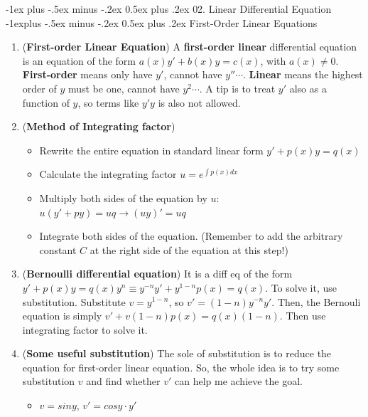 \documentclass[10pt, landscape]{article}
\makeatletter
\renewcommand{\section}{\@startsection{section}{1}{0mm}%
                                {-1ex plus -.5ex minus -.2ex}%
                                {0.5ex plus .2ex}%
                                {\normalfont\large\bfseries}}
\renewcommand{\subsection}{\@startsection{subsection}{2}{0mm}%
                                {-1explus -.5ex minus -.2ex}%
                                {0.5ex plus .2ex}%
                                {\normalfont\normalsize\bfseries}}
\makeatother
\begin{document}
\begin{multicols}{4}
\section{02. Linear Differential Equation}
\subsection{First-Order Linear Equations}
\begin{enumerate}
    \item (\textbf{First-order Linear Equation}) A \textbf{first-order linear} differential equation is an equation of the form $a(x)y'+b(x)y=c(x)$, with $a(x)\neq 0$. \textbf{First-order} means only have $y'$, cannot have $y'' \cdots$. \textbf{Linear} means the highest order of $y$ must be one, cannot have $y^2 \cdots$. A tip is to treat $y'$ also as a function of $y$, so terms like $y'y$ is also not allowed.
    \item (\textbf{Method of Integrating factor})
    \begin{itemize}
        \item Rewrite the entire equation in standard linear form $y'+p(x)y=q(x)$
        \item Calculate the integrating factor $u=e^{\int p(x)dx}$
        \item Multiply both sides of the equation by $u$: $u(y'+py)=uq\rightarrow (uy)'=uq$
        \item Integrate both sides of the equation. (Remember to add the arbitrary constant $C$ at the right side of the equation at this step!)
    \end{itemize}
    \item (\textbf{Bernoulli differential equation}) It is a diff eq of the form $y'+p(x)y=q(x)y^n\equiv y^{-n}y'+y^{1-n}p(x)=q(x)$. To solve it, use substitution. Substitute $v=y^{1-n}$, so $v'=(1-n)y^{-n}y'$. Then, the Bernouli equation is simply $v'+v(1-n)p(x)=q(x)(1-n)$. Then use integrating factor to solve it.
    \item (\textbf{Some useful substitution}) The sole of substitution is to reduce the equation for first-order linear equation. So, the whole idea is to try some substitution $v$ and find whether $v'$ can help me achieve the goal.
    \begin{itemize}
        \item $v=siny$, $v'=cosy\cdot y'$
    \end{itemize}
\end{enumerate}

\end{multicols}
\end{document}

